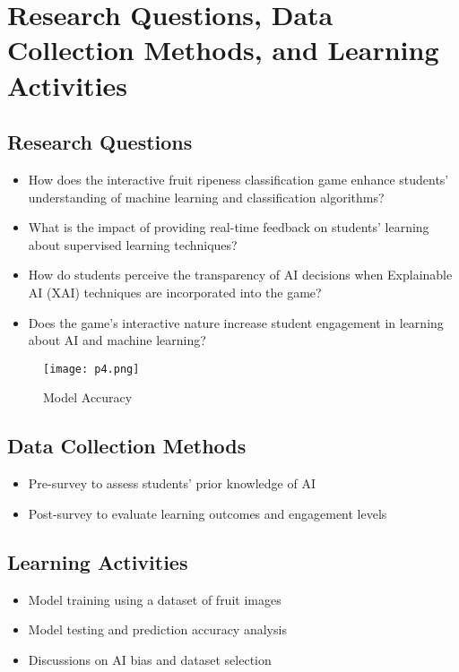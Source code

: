\documentclass[conference]{IEEEtran}
\begin{document}
\section{Research Questions, Data Collection Methods, and Learning Activities}
\subsection{Research Questions}
\begin{itemize}
    \item How does the interactive fruit ripeness classification game enhance students' understanding of machine learning and classification algorithms? 
    \item What is the impact of providing real-time feedback on students' learning about supervised learning techniques?
    \item How do students perceive the transparency of AI decisions when Explainable AI (XAI) techniques are incorporated into the game?
    \item Does the game's interactive nature increase student engagement in learning about AI and machine learning?
\end{itemize}
\begin{figure}[h]
    \centering
    \texttt{[image: p4.png]}  
    \caption{Model Accuracy}
    \label{fig: accuracy} 
\end{figure}
\subsection{Data Collection Methods}
\begin{itemize}
    \item Pre-survey to assess students' prior knowledge of AI
    \item Post-survey to evaluate learning outcomes and engagement levels
\end{itemize}

\subsection{Learning Activities}
\begin{itemize}
    \item Model training using a dataset of fruit images
    \item Model testing and prediction accuracy analysis
    \item Discussions on AI bias and dataset selection
\end{itemize}
\end{document}
